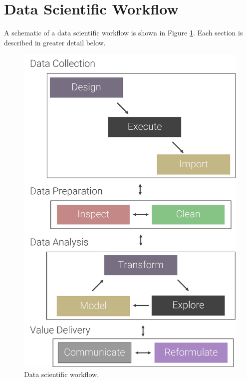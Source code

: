 \documentclass[
]{book}
\begin{document}
\hypertarget{data-scientific-workflow}{%
\section{Data Scientific Workflow}\label{data-scientific-workflow}}

A schematic of a data scientific workflow is shown in Figure \ref{fig:ds-workflow}. Each section is described in greater detail below.

\begin{figure}

{\centering \includegraphics[width=118.67in]{images/data_science_workflow} 

}

\caption{Data scientific workflow.}\label{fig:ds-workflow}
\end{figure}
\end{document}
